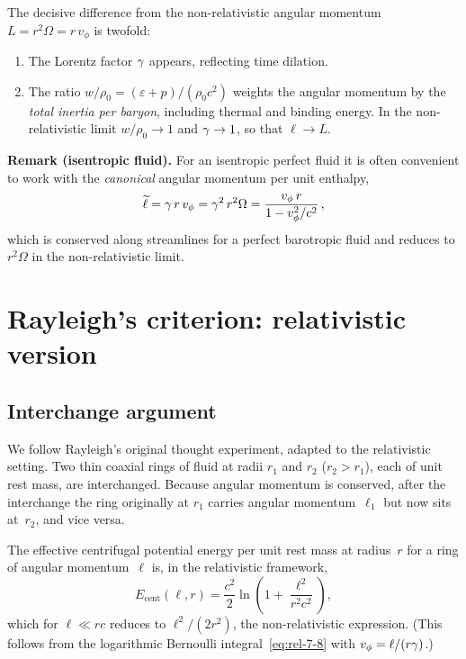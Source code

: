 The decisive difference from the non-relativistic angular momentum
$L=r^{2}\Omega=r\,v_{\phi}$ is twofold:
\begin{enumerate}
\item The Lorentz factor $\gamma$ appears, reflecting time dilation.
\item The ratio $w/\rho_{0}=(\varepsilon+p)/(\rho_{0}c^{2})$
  weights the angular momentum by the \emph{total inertia per baryon},
  including thermal and binding energy.  In the non-relativistic
  limit $w/\rho_{0}\to 1$ and $\gamma\to 1$, so that $\ell\to L$.
\end{enumerate}

\noindent
\textbf{Remark (isentropic fluid).}
For an isentropic perfect fluid it is often convenient to work with the
\emph{canonical} angular momentum per unit enthalpy,
\begin{equation}
\label{eq:rel-7-10}
\widetilde{\ell} = \gamma\,r\,v_{\phi}
                 = \gamma^{2}\,r^{2}\Omega
                 = \frac{v_{\phi}\,r}{1-v_{\phi}^{2}/c^{2}}\,,
\end{equation}
which is conserved along streamlines for a perfect barotropic fluid
and reduces to $r^{2}\Omega$ in the non-relativistic limit.

\section{Rayleigh's criterion: relativistic version}
\label{sec:rel-7-66}

\subsection{Interchange argument}
\label{sec:rel-7-66a}

We follow Rayleigh's original thought experiment, adapted to the
relativistic setting.  Two thin coaxial rings of fluid at radii
$r_{1}$ and $r_{2}$ ($r_{2}>r_{1}$), each of unit rest mass, are
interchanged.  Because angular momentum is conserved, after the
interchange the ring originally at $r_{1}$ carries angular
momentum~$\ell_{1}$ but now sits at~$r_{2}$, and vice versa.

The effective centrifugal potential energy per unit rest mass at
radius~$r$ for a ring of angular momentum~$\ell$ is, in the
relativistic framework,
\begin{equation}
\label{eq:rel-7-11}
E_{\mathrm{cent}}(\ell,r) = \frac{c^{2}}{2}\ln\!\left(
  1+\frac{\ell^{2}}{r^{2}c^{2}}\right),
\end{equation}
which for $\ell\ll rc$ reduces to $\ell^{2}/(2r^{2})$, the
non-relativistic expression.  (This follows from the logarithmic
Bernoulli integral~\eqref{eq:rel-7-8} with $v_{\phi}=\ell/(r\gamma)$.)

